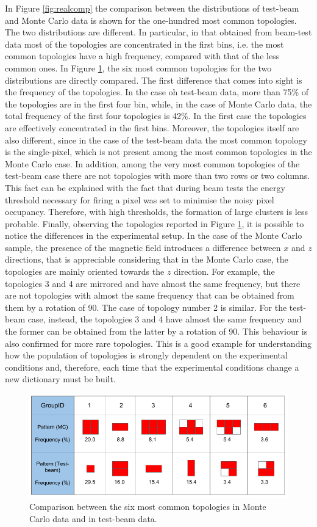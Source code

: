 In Figure \ref{fig:realcomp} the comparison between the distributions of test-beam and Monte Carlo data is shown for the one-hundred most common topologies. The two distributions are different. In particular, in that obtained from beam-test data most of the topologies are concentrated in the first bins, i.e. the most common topologies have a high frequency, compared with that of the less common ones. In Figure \ref{fig:quadratini}, the six most common topologies for the two distributions are directly compared. The first difference that comes into sight is the frequency of the topologies. In the case oh test-beam data, more than 75\% of the topologies are in the first four bin, while, in the case of Monte Carlo data, the total frequency of the first four topologies is 42\%. In the first case the topologies are effectively concentrated in the first bins. Moreover, the topologies itself are also different, since in the case of the test-beam data the most common topology is the single-pixel, which is not present among the most common topologies in the Monte Carlo case. In addition, among the very most common topologies of the test-beam case there are not topologies with more than two rows or two columns. This fact can be explained with the fact that during beam tests the energy threshold necessary for firing a pixel was set to minimise the noisy pixel occupancy. Therefore, with high thresholds, the formation of large clusters is less probable. Finally, observing the topologies reported in Figure \ref{fig:quadratini}, it is possible to notice the differences in the experimental setup. In the case of the Monte Carlo sample, the presence of the magnetic field introduces a difference between $x$ and $z$ directions, that is appreciable considering that in the Monte Carlo case, the topologies are mainly oriented towards the $z$ direction. For example, the topologies 3 and 4 are mirrored and have almost the same frequency, but there are not topologies with almost the same frequency that can be obtained from them by a rotation of 90\textdegree. The case of topology number 2 is similar. For the test-beam case, instead, the topologies 3 and 4 have almost the same frequency and the former can be obtained from the latter by a rotation of 90\textdegree. This behaviour is also confirmed for more rare topologies. This is a good example for understanding how the population of topologies is strongly dependent on the experimental conditions and, therefore, each time that the experimental conditions change a new dictionary must be built.
\begin{figure}
  \centering
  \includegraphics[scale=0.5]{figures/quadratini.png}
  \caption{Comparison between the six most common topologies in Monte Carlo data and in test-beam data.}
  \label{fig:quadratini}
\end{figure}
%